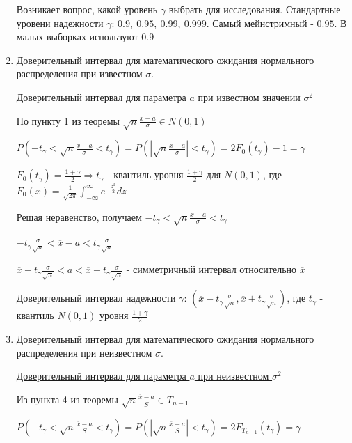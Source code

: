 \begin{enumerate}
     Возникает вопрос, какой уровень $\gamma$ выбрать для исследования.
    Стандартные уровени надежности $\gamma$: $0.9, \ 0.95, \ 0.99, \ 0.999$. Самый мейнстримный - $0.95$. 
    В малых выборках используют $0.9$

    \item Доверительный интервал для математического ожидания нормального распределения при известном $\sigma$.

    \hyperlink{confidence_interval_for_a_known_sigma}{Доверительный интервал для параметра $a$ при известном значении $\sigma^2$}

    По пункту 1 из теоремы $\sqrt{n} \frac{\overline{x} - a}{\sigma} \in N(0, 1)$ 

    $P\left(-t_\gamma < \sqrt{n} \frac{\overline{x} - a}{\sigma} < t_\gamma\right) = 
    P\left(\left|\sqrt{n} \frac{\overline{x} - a}{\sigma}\right| < t_\gamma\right) = 2F_0 (t_\gamma) - 1 = \gamma$

    $F_0(t_\gamma) = \frac{1 + \gamma}{2} \Longrightarrow t_\gamma$ - квантиль уровня 
    $\frac{1 + \gamma}{2}$ для $N(0, 1)$, где
    $F_0(x) = \frac{1}{\sqrt{2\pi}} \int_{-\infty}^{\infty} e^{-\frac{z^2}{2}} dz$

    Решая неравенство, получаем $-t_\gamma < \sqrt{n} \frac{\overline{x} - a}{\sigma} < t_\gamma$

    $-t_\gamma \frac{\sigma}{\sqrt{n}} < \overline{x} - a < t_\gamma \frac{\sigma}{\sqrt{n}}$

    $\overline{x} - t_\gamma \frac{\sigma}{\sqrt{n}} < a < \overline{x} + t_\gamma \frac{\sigma}{\sqrt{n}}$ - 
    симметричный интервал относительно $\overline{x}$

    Доверительный интервал надежности $\gamma$: $\left(\overline{x} - t_\gamma \frac{\sigma}{\sqrt{n}}, 
    \overline{x} + t_\gamma \frac{\sigma}{\sqrt{n}}\right)$, 
    где $t_\gamma$ - квантиль $N(0, 1)$ уровня $\frac{1 + \gamma}{2}$

    \item Доверительный интервал для математического ожидания нормального распределения при неизвестном $\sigma$.

    \hyperlink{confidence_interval_for_a_unknown_sigma}{Доверительный интервал для параметра $a$ при неизвестном $\sigma^2$}

    Из пункта 4 из теоремы $\sqrt{n} \frac{\overline{x} - a}{S} \in T_{n - 1}$

    $P\left(-t_\gamma < \sqrt{n} \frac{\overline{x} - a}{S} < t_\gamma\right) = P\left(\left|\sqrt{n} \frac{\overline{x} - a}{S}\right| < t_\gamma\right) = 2F_{T_{n - 1}}(t_\gamma) = \gamma$


\end{enumerate}
